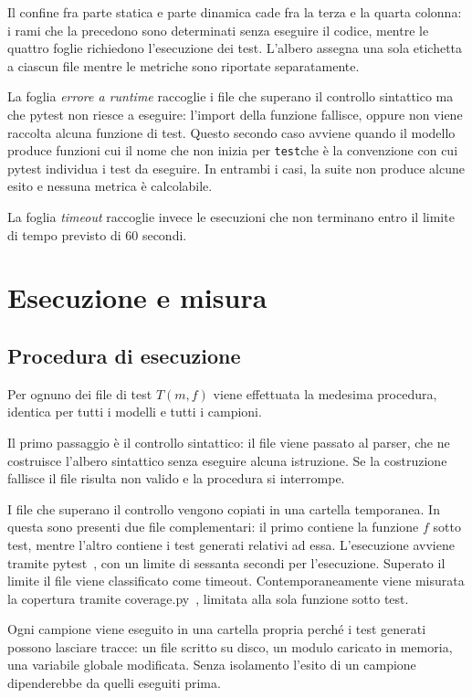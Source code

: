 Il confine fra parte statica e parte dinamica cade fra la terza e la quarta colonna: i rami che la precedono sono determinati senza eseguire il codice, mentre le quattro foglie richiedono l'esecuzione dei test. L'albero assegna una sola etichetta a ciascun file mentre le metriche sono riportate separatamente.

La foglia \emph{errore a runtime} raccoglie i file che superano il controllo sintattico ma che pytest non riesce a eseguire: l'import della funzione fallisce, oppure non viene raccolta alcuna funzione di test. Questo secondo caso avviene quando il modello produce funzioni cui il nome che non inizia per \texttt{test}che è la convenzione con cui pytest individua i test da eseguire. In entrambi i casi, la suite non produce alcune esito e nessuna metrica è calcolabile.

La foglia \emph{timeout} raccoglie invece le esecuzioni che non terminano entro il limite di tempo previsto di 60 secondi.


\section{Esecuzione e misura}
\label{sec:esecuzione}

\subsection{Procedura di esecuzione}
\label{sec:procedura}
Per ognuno dei file di test $T(m,f)$ viene effettuata la medesima procedura,
identica per tutti i modelli e tutti i campioni.

Il primo passaggio è il controllo sintattico: il file viene passato al parser,
che ne costruisce l'albero sintattico senza eseguire alcuna istruzione. Se la
costruzione fallisce il file risulta non valido e la procedura si interrompe.

I file che superano il controllo vengono copiati in una cartella temporanea. In
questa sono presenti due file complementari: il primo contiene la funzione $f$
sotto test, mentre l'altro contiene i test generati relativi ad essa.
L'esecuzione avviene tramite pytest~\cite{pytest}, con un limite di sessanta
secondi per l'esecuzione. Superato il limite il file viene classificato come
timeout. Contemporaneamente viene misurata la copertura tramite
coverage.py~\cite{coveragepy}, limitata alla sola funzione sotto test.

Ogni campione viene eseguito in una cartella propria perché i test generati
possono lasciare tracce: un file scritto su disco, un modulo caricato in memoria,
una variabile globale modificata. Senza isolamento l'esito di un campione
dipenderebbe da quelli eseguiti prima.

